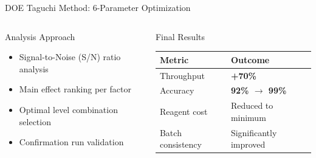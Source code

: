 \documentclass[aspectratio=169,10pt]{beamer}
\begin{document}
\begin{frame}{DOE Taguchi Method: 6-Parameter Optimization}
\begin{columns}[T]
      \begin{block}{Analysis Approach}
        \small
        \begin{itemize}
          \item Signal-to-Noise (S/N) ratio analysis
          \item Main effect ranking per factor
          \item Optimal level combination selection
          \item Confirmation run validation
        \end{itemize}
      \end{block}
      \vspace{0.1cm}
      \begin{alertblock}{Final Results}
        \footnotesize
        \begin{tabular}{p{2.2cm}p{2.9cm}}
          \toprule
          Metric & Outcome \\
          \midrule
          Throughput        & \textbf{+70\%} \\
          Accuracy          & \textbf{92\% $\to$ 99\%} \\
          Reagent cost      & Reduced to minimum \\
          Batch consistency & Significantly improved \\
          \bottomrule
        \end{tabular}
      \end{alertblock}
  \end{columns}
\end{frame}

\end{document}
